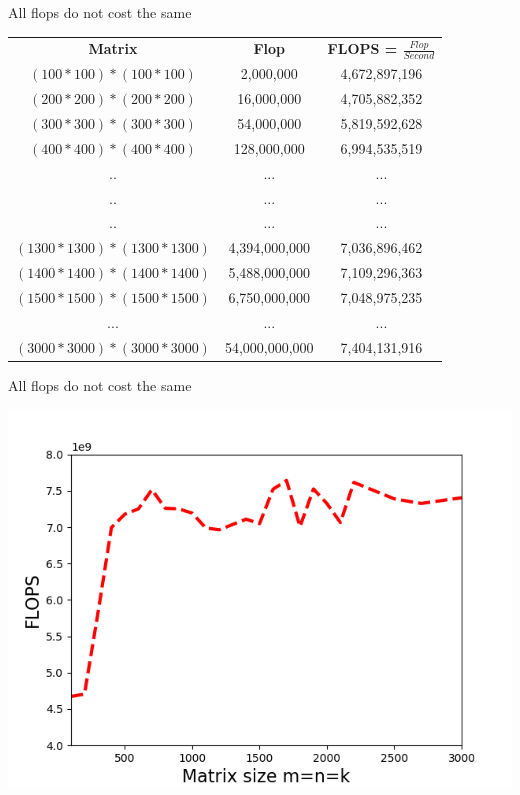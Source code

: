 \documentclass[10pts]{beamer}
\begin{document}
	   
	   \begin{frame}{All flops do not cost the same }
	   	\begin{center}
	   		\begin{tabular}{c c c }
	   			\textbf{Matrix} & \textbf{Flop} & \textbf{FLOPS = $\frac{Flop}{Second}$}  \\ 
		   		 $(100*100) * (100*100)$ &  2,000,000    &  4,672,897,196\\ 
	   			 $(200*200) * (200*200)$ &  16,000,000   &  4,705,882,352\\ 
	   			 $(300*300) * (300*300)$ &  54,000,000   &  5,819,592,628\\
	   			 $(400*400) * (400*400)$ &  128,000,000  & 6,994,535,519\\
	   			 ..  &  ... & ...\\
	   			 ..  &  ...&...\\
	   			 ..  &  ...&...\\
	   			 $(1300*1300) * (1300*1300)$&  4,394,000,000&7,036,896,462\\
	   			 $(1400*1400) * (1400*1400)$&  5,488,000,000&7,109,296,363 \\
	   			 $(1500*1500) * (1500*1500)$&  6,750,000,000&7,048,975,235\\
	   			 ...& ...& ...\\
	   			 $(3000*3000) * (3000*3000)$&  54,000,000,000&7,404,131,916\\
	   		\end{tabular} 
	   	\end{center}
	   \end{frame} 
	  
	  \begin{frame}[t]{All flops do not cost the same }
	  	\begin{center}
	  	 	\includegraphics[scale =0.6]{benchmarkcurve.png}
	  	\end{center}
	  \end{frame} 
	  
\end{document}
